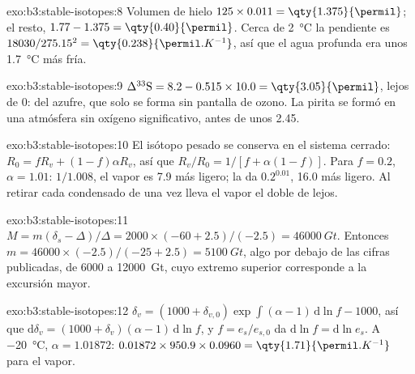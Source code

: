 \begin{solution}{exo:b3:stable-isotopes:8}
Volumen de hielo $125\times0.011 = \qty{1.375}{\permil}$; el resto, $1.77 - 1.375 =
\qty{0.40}{\permil}$. Cerca de \qty{2}{\celsius} la pendiente es $18030/275.15^2 =
\qty{0.238}{\permil.K^{-1}}$, así que el agua profunda era unos \qty{1.7}{\celsius}
más fría.
\end{solution}

\begin{solution}{exo:b3:stable-isotopes:9}
$\Delta^{33}\mathrm S = 8.2 - 0.515\times10.0 = \qty{3.05}{\permil}$, lejos de 0:
 del azufre, que solo se forma sin pantalla de ozono. La pirita
se formó en una atmósfera sin oxígeno significativo, antes de unos
\qty{2.45}{\Ga}.
\end{solution}

\begin{solution}{exo:b3:stable-isotopes:10}
El isótopo pesado se conserva en el sistema cerrado: $R_0 = fR_v + (1 -
f)\alpha R_v$, así que $R_v/R_0 = 1/[f + \alpha(1 - f)]$. Para $f = 0.2$, $\alpha =
1.01$: $1/1.008$, el vapor es \qty{7.9}{\permil} más ligero; la  da
$0.2^{0.01}$, \qty{16.0}{\permil} más ligero. Al retirar cada condensado de una vez
lleva el vapor el doble de lejos.
\end{solution}

\begin{solution}{exo:b3:stable-isotopes:11}
$M = m(\delta_s - \Delta)/\Delta = 2000\times(-60 + 2.5)/(-2.5) = \qty{46000}{Gt}$.
Entonces $m = 46000\times(-2.5)/(-25 + 2.5) = \qty{5100}{Gt}$, algo por debajo de las
cifras publicadas, de 6000 a \qty{12000}{Gt}, cuyo extremo superior corresponde a la
excursión mayor.
\end{solution}

\begin{solution}{exo:b3:stable-isotopes:12}
$\delta_v = (1000 + \delta_{v,0})\exp\int(\alpha - 1)\,\mathrm d\ln f - 1000$, así que
$\mathrm d\delta_v = (1000 + \delta_v)(\alpha - 1)\,\mathrm d\ln f$, y $f =
e_s/e_{s,0}$ da $\mathrm d\ln f = \mathrm d\ln e_s$. A \qty{-20}{\celsius},
$\alpha = 1.01872$: $0.01872\times950.9\times0.0960 =
\qty{1.71}{\permil.K^{-1}}$ para el vapor.
\end{solution}

